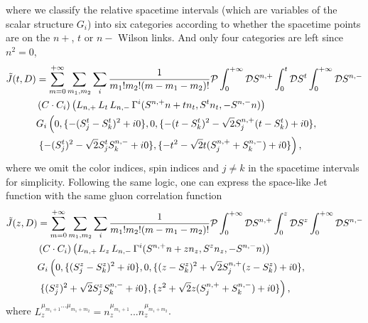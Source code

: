 \documentclass[a4paper,11pt]{article}
\begin{document}
where we classify the relative spacetime intervals (which are variables of the scalar structure $G_i$) into six categories according to whether the spacetime points are on the $n+$, $t$ or $n-$ Wilson links. And only four categories are left since $n^2=0$,
\begin{align}\label{timelikeJetf}
\tilde J(t,D)&=\sum_{m=0}^{+\infty} \sum_{m_1,m_2} \sum_{i} \frac{1}{m_1! m_2! (m-m_1-m_2)!} {\cal P} \int^{+ \infty}_{0} {\cal D} S^{n,+} \int^{t}_{0} {\cal D} S^{t} 
\int^{+\infty}_{0} {\cal D} S^{n,-} \nonumber\\
&\left(C \cdot C_{i}\right) \left(L_{n,+}\, L_{t} \, L_{n,-} \, \Gamma^{i}(S^{n,+} n + t n_t,S^{t} n_t,-S^{n,-} n)\right) \nonumber\\ 
&G_{i}\left(0,\{-(S^{t}_j-S^{t}_k)^2+i0\}, 0,
\{-(t - S^{t}_k)^2-\sqrt{2} S^{n,+}_j (t-S^{t}_k)+i0\}, \right. \nonumber\\
& \left. \{-(S^{t}_j)^2 - \sqrt{2} S^{t}_j S^{n,-}_k+i0\},\{-t^2-\sqrt{2} t (S^{n,+}_j + S^{n,-}_k)+i0\} \right),
\end{align}
where we omit the color indices, spin indices and $j\neq k$ in the spacetime intervals for simplicity. Following the same logic, one can express the space-like Jet function with the same gluon correlation function
\begin{align}\label{spacelikeJetf}
\tilde J(z,D)&=\sum_{m=0}^{+\infty} \sum_{m_1,m_2} \sum_{i} \frac{1}{m_1! m_2! (m-m_1-m_2)!} {\cal P} \int^{+ \infty}_{0} {\cal D} S^{n,+} \int^{z}_{0} {\cal D} S^{z} 
\int^{+\infty}_{0} {\cal D} S^{n,-} \nonumber\\
&\left(C \cdot C_{i}\right) \left(L_{n,+}\, L_{z} \, L_{n,-} \, \Gamma^{i}(S^{n,+} n + z n_z,S^{z} n_z,-S^{n,-} n)\right) \nonumber\\ 
&G_{i}\left(0,\{(S^{z}_j-S^{z}_k)^2+i0\}, 0,
\{(z - S^{z}_k)^2+\sqrt{2} S^{n,+}_j (z-S^{z}_k)+i0\}, \right. \nonumber\\
& \left. \{(S^{z}_j)^2 + \sqrt{2} S^{z}_j S^{n,-}_k+i0\},\{z^2+\sqrt{2} z (S^{n,+}_j + S^{n,-}_k)+i0\} \right),
\end{align}
where $L^{\mu_{m_1+1} ... \mu_{m_1+m_2}}_{z}=n_z^{\mu_{m_1+1}}...n_z^{\mu_{m_1+m_2}}$.
\end{document}
